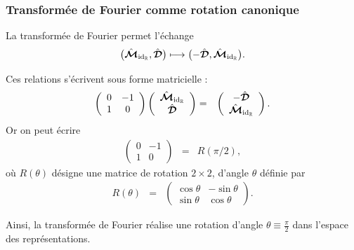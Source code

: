 \subsubsection{Transformée de Fourier comme rotation canonique}

La transformée de Fourier permet l’échange
\begin{eqnarray}
    \bigl(\hat{\bm{\mathcal M}}_{\mathrm{id}_{\mathbb R}}, \hat{\bm{\mathcal D}}\bigr)
    \longmapsto
    \bigl(-\hat{\bm{\mathcal D}}, \hat{\bm{\mathcal M}}_{\mathrm{id}_{\mathbb R}}\bigr).
\end{eqnarray}

Ces relations s’écrivent sous forme matricielle :
\begin{eqnarray}
    \left(
    \begin{array}{cc}
        0 & -1 \\
        1 & 0
    \end{array}
    \right)
    \left(
    \begin{array}{c}
        \hat{\bm{\mathcal M}}_{\mathrm{id}_{\mathbb R}} \\
        \hat{\bm{\mathcal D}}
    \end{array}
    \right)
    &=&
    \left(
    \begin{array}{c}
        - \hat{\bm{\mathcal D}} \\
        \hat{\bm{\mathcal M}}_{\mathrm{id}_{\mathbb R}}
    \end{array}
    \right).
\end{eqnarray}
Or on peut écrire 
\begin{eqnarray}
    \left(
    \begin{array}{cc}
        0 & -1 \\
        1 & 0
    \end{array}
    \right)
    & = &
    R(\pi/2),
\end{eqnarray}
où $R(\theta)$ désigne une matrice de rotation $2\times 2$, d'angle $\theta$ définie par
\begin{eqnarray}
    R(\theta)
    & = &
    \left(
    \begin{array}{cc}
        \cos \theta & -\sin \theta \\
        \sin \theta & \cos \theta
    \end{array}
    \right).
\end{eqnarray}

Ainsi, la transformée de Fourier réalise une rotation d’angle
$\theta \equiv \frac{\pi}{2}$ dans l’espace des représentations.

